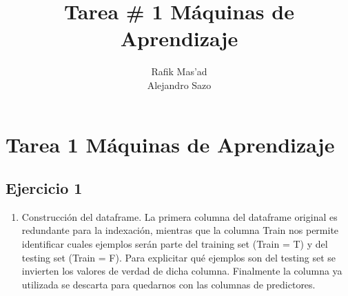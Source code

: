 \documentclass[11pt]{article}
\title{Tarea \# 1 Máquinas de Aprendizaje}
\author{Rafik Mas'ad\\Alejandro Sazo}
\begin{document}
    
    
    \maketitle
    
    

    
    \section{Tarea 1 Máquinas de
Aprendizaje}\label{tarea-1-muxe1quinas-de-aprendizaje}

    \subsection{Ejercicio 1}\label{ejercicio-1}

    \begin{enumerate}
\def\labelenumi{(\alph{enumi})}
\itemsep1pt\parskip0pt
\item
  Construcción del dataframe. La primera columna del dataframe original
  es redundante para la indexación, mientras que la columna Train nos
  permite identificar cuales ejemplos serán parte del training set
  (Train = T) y del testing set (Train = F). Para explicitar qué
  ejemplos son del testing set se invierten los valores de verdad de
  dicha columna. Finalmente la columna ya utilizada se descarta para
  quedarnos con las columnas de predictores.
\end{enumerate}
\end{document}
